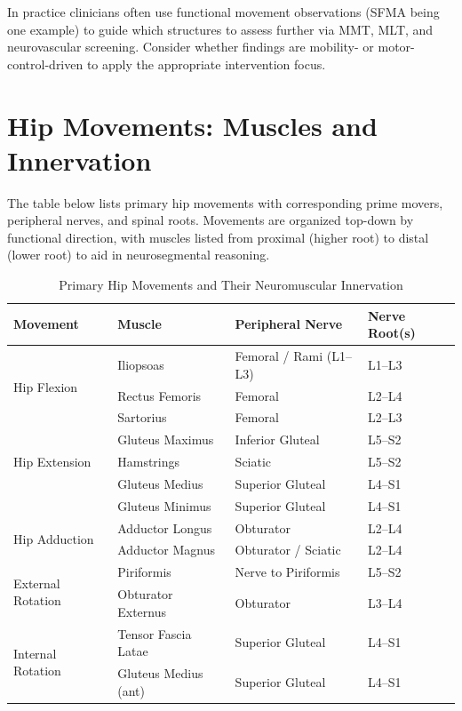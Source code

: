 \vspace{0.25cm}

\noindent
In practice clinicians often use functional movement observations (SFMA being one example) to guide which structures to assess further via MMT, MLT, and neurovascular screening. Consider whether findings are mobility- or motor-control-driven to apply the appropriate intervention focus.


\section*{Hip Movements: Muscles and Innervation}

\vspace{0.25cm}

\noindent
The table below lists primary hip movements with corresponding prime movers, peripheral nerves, and spinal roots. Movements are organized top-down by functional direction, with muscles listed from proximal (higher root) to distal (lower root) to aid in neurosegmental reasoning.

\begin{table}[H]
\centering
\captionsetup{justification=raggedright, singlelinecheck=false}
\begin{tabular}{|p{3.5cm}|p{5cm}|p{4cm}|p{2.5cm}|}
\hline
\textbf{Movement} & \textbf{Muscle} & \textbf{Peripheral Nerve} & \textbf{Nerve Root(s)} \\
\hline
\multirow{3}{*}{Hip Flexion}
  & Iliopsoas & Femoral / Rami (L1–L3) & L1–L3 \\
  & Rectus Femoris & Femoral & L2–L4 \\
  & Sartorius & Femoral & L2–L3 \\
\hline
\multirow{3}{*}{Hip Extension}
  & Gluteus Maximus & Inferior Gluteal & L5–S2 \\
  & Hamstrings & Sciatic & L5–S2 \\
\hline
\multirow{2}{*}{Hip Abduction}
  & Gluteus Medius & Superior Gluteal & L4–S1 \\
  & Gluteus Minimus & Superior Gluteal & L4–S1 \\
\hline
\multirow{2}{*}{Hip Adduction}
  & Adductor Longus & Obturator & L2–L4 \\
  & Adductor Magnus & Obturator / Sciatic & L2–L4 \\
\hline
\multirow{2}{*}{External Rotation}
  & Piriformis & Nerve to Piriformis & L5–S2 \\
  & Obturator Externus & Obturator & L3–L4 \\
\hline
\multirow{2}{*}{Internal Rotation}
  & Tensor Fascia Latae & Superior Gluteal & L4–S1 \\
  & Gluteus Medius (ant) & Superior Gluteal & L4–S1 \\
\hline
\end{tabular}
\caption{Primary Hip Movements and Their Neuromuscular Innervation}
\end{table}

